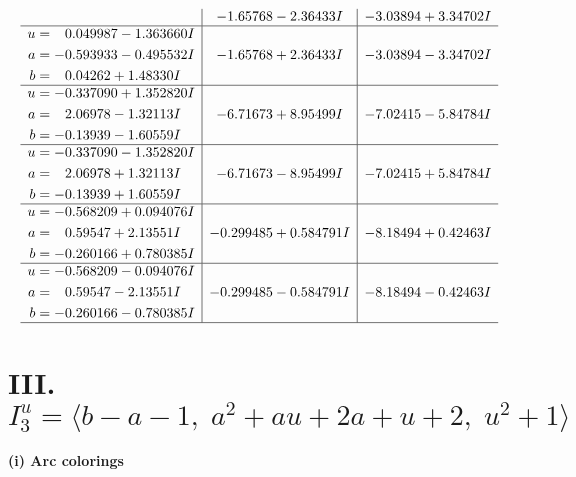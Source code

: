 \documentclass[1p]{elsarticle_modified}
\theoremstyle{definition}
\begin{document}
$$\begin{array}{c|c|c}
 & -1.65768 - 2.36433 I & -3.03894 + 3.34702 I \\ \hline\begin{aligned}
u &= \phantom{-}0.049987 - 1.363660 I \\
a &= -0.593933 - 0.495532 I \\
b &= \phantom{-}0.04262 + 1.48330 I\end{aligned}
 & -1.65768 + 2.36433 I & -3.03894 - 3.34702 I \\ \hline\begin{aligned}
u &= -0.337090 + 1.352820 I \\
a &= \phantom{-}2.06978 - 1.32113 I \\
b &= -0.13939 - 1.60559 I\end{aligned}
 & -6.71673 + 8.95499 I & -7.02415 - 5.84784 I \\ \hline\begin{aligned}
u &= -0.337090 - 1.352820 I \\
a &= \phantom{-}2.06978 + 1.32113 I \\
b &= -0.13939 + 1.60559 I\end{aligned}
 & -6.71673 - 8.95499 I & -7.02415 + 5.84784 I \\ \hline\begin{aligned}
u &= -0.568209 + 0.094076 I \\
a &= \phantom{-}0.59547 + 2.13551 I \\
b &= -0.260166 + 0.780385 I\end{aligned}
 & -0.299485 + 0.584791 I & -8.18494 + 0.42463 I \\ \hline\begin{aligned}
u &= -0.568209 - 0.094076 I \\
a &= \phantom{-}0.59547 - 2.13551 I \\
b &= -0.260166 - 0.780385 I\end{aligned}
 & -0.299485 - 0.584791 I & -8.18494 - 0.42463 I\\
 \hline 
 \end{array}$$\newpage\newpage\renewcommand{\arraystretch}{1}
\centering \section*{III. $I^u_{3}= \langle b- a-1,\;a^2+a u+2 a+u+2,\;u^2+1 \rangle$}
\flushleft \textbf{(i) Arc colorings}\\
\end{document}
